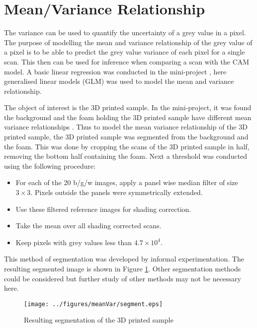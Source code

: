 \documentclass[a4paper]{proc}
\begin{document}
\section{Mean/Variance Relationship}
The variance can be used to quantify the uncertainty of a grey value in a pixel. The purpose of modelling the mean and variance relationship of the grey value of a pixel is to be able to predict the grey value variance of each pixel for a single scan. This then can be used for inference when comparing a scan with the CAM model. A basic linear regression was conducted in the mini-project \cite{ip2016inside}, here generalised linear models (GLM) \cite{nelder1972generalized} \cite{mccullagh1984generalized} was used to model the mean and variance relationship.

The object of interest is the 3D printed sample. In the mini-project, it was found the background and the foam holding the 3D printed sample have different mean variance relationships \cite{ip2016inside}. Thus to model the mean variance relationship of the 3D printed sample, the 3D printed sample was segmented from the background and the foam. This was done by cropping the scans of the 3D printed sample in half, removing the bottom half containing the foam. Next a threshold was conducted using the following procedure: 
\begin{itemize}
	\item For each of the 20 b/g/w images, apply a panel wise median filter of size $3\times3$. Pixels outside the panels were symmetrically extended.
	\item Use these filtered reference images for shading correction.
	\item Take the mean over all shading corrected scans.
	\item Keep pixels with grey values less than $4.7\times 10^4$.
\end{itemize}
This method of segmentation was developed by informal experimentation. The resulting segmented image is shown in Figure \ref{fig:segment}. Other segmentation methods could be considered but further study of other methods may not be necessary here.

\begin{figure}
	\centering
	\texttt{[image: ../figures/meanVar/segment.eps]}
	\caption{Resulting segmentation of the 3D printed sample}
	\label{fig:segment}
\end{figure}
\end{document}
